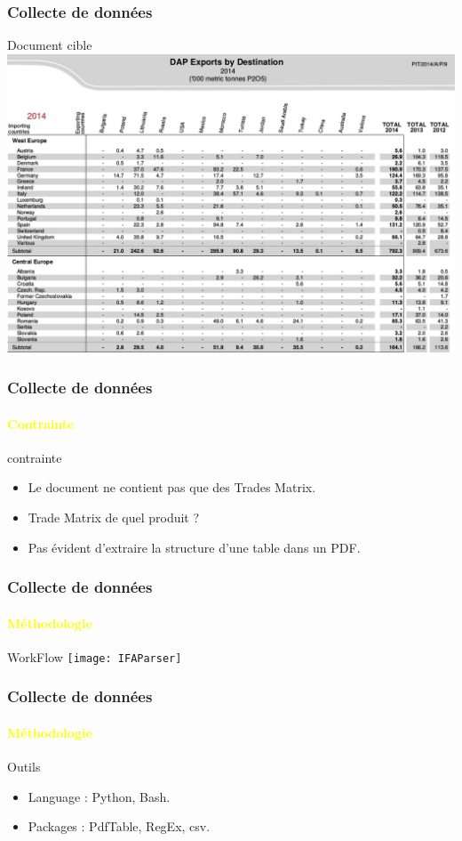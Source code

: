 \documentclass{beamer}
\begin{document}
\begin{frame}
  \frametitle{Collecte de données}
	\begin{block}{Document cible}
    		\includegraphics[width=\textwidth, height=0.8\textheight, keepaspectratio]{DocIFA}
	\end{block}
\end{frame}

\begin{frame}
  \frametitle{Collecte de données}
  \framesubtitle{\textbf{\textcolor{yellow}{Contrainte}}}
  \begin{block}{contrainte}
  	\begin{itemize}
    		\item Le document ne contient pas que des Trades Matrix.
    		\item Trade Matrix de quel produit ?
    		\item Pas évident d'extraire la structure d'une table dans un PDF.
  	\end{itemize}
  \end{block}
\end{frame}

\begin{frame}
  \frametitle{Collecte de données}
  \framesubtitle{\textbf{\textcolor{yellow}{Méthodologie}}}
	\begin{block}{WorkFlow}
    		\texttt{[image: IFAParser]}
	\end{block}
\end{frame}


\begin{frame}
  \frametitle{Collecte de données}
  \framesubtitle{\textbf{\textcolor{yellow}{Méthodologie}}}

  \begin{block}{Outils}
  	\begin{itemize}
    		\item Language : Python, Bash.
    		\item Packages : PdfTable, RegEx, csv.
  	\end{itemize}
  \end{block}
 \end{frame}
\end{document}
